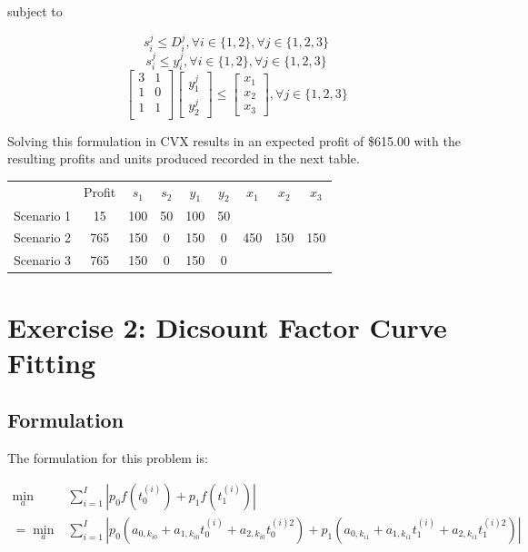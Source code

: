 \documentclass[a4paper]{article}
\begin{document}
subject to

\begin{equation}
s_i^j \leq D_i^j , \forall i \in \{1,2\} , \forall j \in \{1,2,3\}
\end{equation}
\begin{equation}
s_i^j \leq y_i^j, \forall i \in \{1,2\} , \forall j \in \{1,2,3\}
\end{equation}
\begin{equation}
\left[
\begin{matrix}
3 & 1 \\
1 & 0 \\
1 & 1 \\
\end{matrix}
\right]
\left[\begin{matrix}y_1^j \\ y_2^j\end{matrix}\right]
\leq
\left[\begin{matrix}x_1 \\ x_2 \\ x_3 \end{matrix}\right]
, \forall j \in \{1,2,3\}
\end{equation}

Solving this formulation in CVX results in an expected profit of \$615.00 with the resulting profits and units produced recorded in the next table.

\begin{tabular}{c  c  c c  c c c c c}
           & Profit & $s_1$ & $s_2$ & $y_1$ & $y_2$ & $x_1$ & $x_2$ & $x_3$ \\
Scenario 1 &   15   & 100   & 50    & 100   & 50    &       &       &       \\
Scenario 2 &  765   & 150   & 0     & 150   & 0     & 450   & 150   & 150   \\
Scenario 3 &  765   & 150   & 0     & 150   & 0     &       &       &       \\
\end{tabular}

\section{Exercise 2: Dicsount Factor Curve Fitting }
\subsection{Formulation}
The formulation for this problem is:

\begin{equation}
\begin{aligned}
\min_a & \sum_{i=1}^I | p_0 f(t_0^{(i)}) +  p_1 f(t_1^{(i)}) |
\\ = \min_a & \sum_{i=1}^I | p_0 (a_{0,k_{i0}} + a_{1,k_{i0}} t_0^{(i)} + a_{2,k_{i0}} t_0^{(i) 2} )
+  p_1 (a_{0,k_{i1}} + a_{1,k_{i1}} t_1^{(i)} + a_{2,k_{i1}} t_1^{(i) 2} ) |
\end{aligned}
\end{equation}
\end{document}
